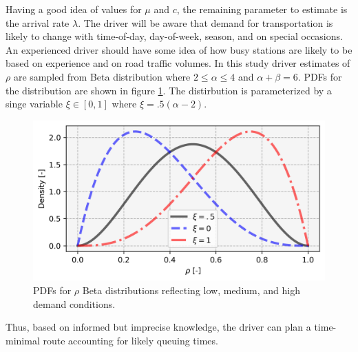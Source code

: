 Having a good idea of values for $\mu$ and $c$, the remaining parameter to estimate is the arrival rate $\lambda$. The driver will be aware that demand for transportation is likely to change with time-of-day, day-of-week, season, and on special occasions. An experienced driver should have some idea of how busy stations are likely to be based on experience and on road traffic volumes. In this study driver estimates of $\rho$ are sampled from Beta distribution where $2\leq \alpha \leq 4$ and $\alpha + \beta = 6$. PDFs for the distribution are shown in figure \ref{fig:rho_distributions}. The distirbution is parameterized by a singe variable $\xi\in [0, 1]$ where $\xi = .5 (\alpha - 2)$.

\begin{figure}[H]
	\centering
	\includegraphics[width = \linewidth]{figs/rho_distributions.png}
	\caption{PDFs for $\rho$ Beta distributions reflecting low, medium, and high demand conditions.}
	\label{fig:rho_distributions}
\end{figure}

Thus, based on informed but imprecise knowledge, the driver can plan a time-minimal route accounting for likely queuing times.